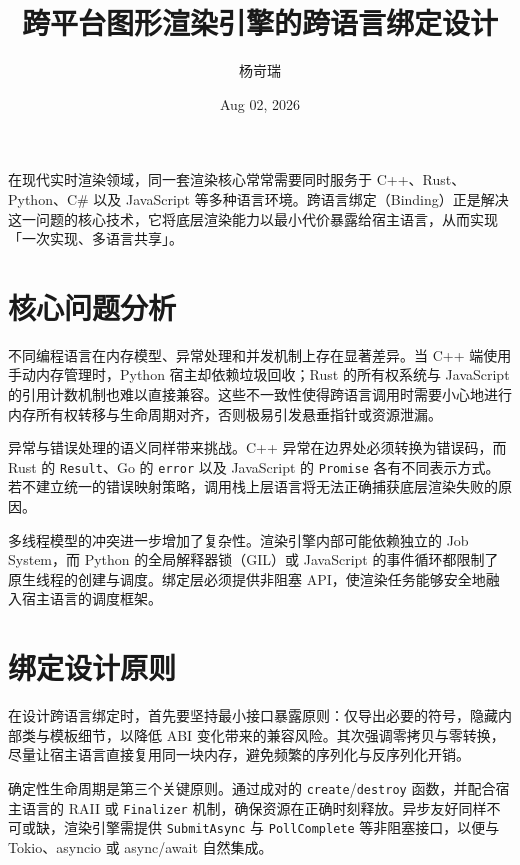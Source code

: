 \title{跨平台图形渲染引擎的跨语言绑定设计}
\author{杨岢瑞}
\date{Aug 02, 2026}
\maketitle
在现代实时渲染领域，同一套渲染核心常常需要同时服务于 C++、Rust、Python、C\#{} 以及 JavaScript 等多种语言环境。跨语言绑定（Binding）正是解决这一问题的核心技术，它将底层渲染能力以最小代价暴露给宿主语言，从而实现「一次实现、多语言共享」。\par
\chapter{核心问题分析}
不同编程语言在内存模型、异常处理和并发机制上存在显著差异。当 C++ 端使用手动内存管理时，Python 宿主却依赖垃圾回收；Rust 的所有权系统与 JavaScript 的引用计数机制也难以直接兼容。这些不一致性使得跨语言调用时需要小心地进行内存所有权转移与生命周期对齐，否则极易引发悬垂指针或资源泄漏。\par
异常与错误处理的语义同样带来挑战。C++ 异常在边界处必须转换为错误码，而 Rust 的 \texttt{Result}、Go 的 \texttt{error} 以及 JavaScript 的 \texttt{Promise} 各有不同表示方式。若不建立统一的错误映射策略，调用栈上层语言将无法正确捕获底层渲染失败的原因。\par
多线程模型的冲突进一步增加了复杂性。渲染引擎内部可能依赖独立的 Job System，而 Python 的全局解释器锁（GIL）或 JavaScript 的事件循环都限制了原生线程的创建与调度。绑定层必须提供非阻塞 API，使渲染任务能够安全地融入宿主语言的调度框架。\par
\chapter{绑定设计原则}
在设计跨语言绑定时，首先要坚持最小接口暴露原则：仅导出必要的符号，隐藏内部类与模板细节，以降低 ABI 变化带来的兼容风险。其次强调零拷贝与零转换，尽量让宿主语言直接复用同一块内存，避免频繁的序列化与反序列化开销。\par
确定性生命周期是第三个关键原则。通过成对的 \texttt{create}/\texttt{destroy} 函数，并配合宿主语言的 RAII 或 \texttt{Finalizer} 机制，确保资源在正确时刻释放。异步友好同样不可或缺，渲染引擎需提供 \texttt{SubmitAsync} 与 \texttt{PollComplete} 等非阻塞接口，以便与 Tokio、asyncio 或 async/await 自然集成。\par
